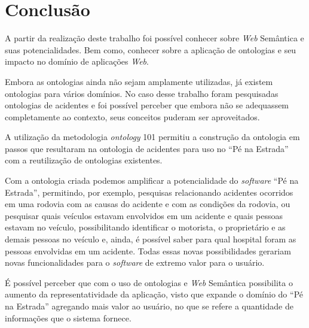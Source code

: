 \chapter{Conclusão}

A partir da realização deste trabalho foi possível conhecer sobre \textit{Web} Semântica e suas potencialidades. 
Bem como, conhecer sobre a aplicação de ontologias e seu impacto no domínio de aplicações \textit{Web}.

Embora as ontologias ainda não sejam amplamente utilizadas, já existem ontologias para vários domínios. No caso
desse trabalho foram pesquisadas ontologias de acidentes e foi possível perceber que embora não se adequassem
completamente ao contexto, seus conceitos puderam ser aproveitados.

A utilização da metodologia \textit{ontology} 101 permitiu a construção da ontologia em passos que resultaram na ontologia
de acidentes para uso no ``Pé na Estrada'' com a reutilização de ontologias existentes.

Com a ontologia criada podemos amplificar a potencialidade do \textit{software} ``Pé na Estrada'', permitindo, por exemplo, pesquisas
relacionando acidentes ocorridos em uma rodovia com as causas do acidente e com as condições da rodovia, ou pesquisar
quais veículos estavam envolvidos em um acidente e quais pessoas estavam no veículo, possibilitando identificar o
motorista, o proprietário e as demais pessoas no veículo e, ainda, é possível saber para qual hospital foram as
pessoas envolvidas em um acidente. Todas essas novas possibilidades gerariam novas funcionalidades
para o \textit{software} de extremo valor para o usuário.

É possível perceber que com o uso de ontologias e \textit{Web} Semântica possibilita o aumento da representatividade
da aplicação, visto que expande o domínio do ``Pé na Estrada'' agregando mais valor ao usuário, no que se refere a quantidade
de informações que o sistema fornece.
